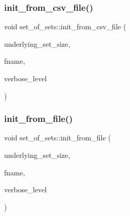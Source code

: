 \mbox{\label{classset__of__sets_ad8d229458a678f6e39a65c478d3d3bda}} 
\subsubsection{\texorpdfstring{init\+\_\+from\+\_\+csv\+\_\+file()}{init\_from\_csv\_file()}}
{\footnotesize\ttfamily void set\+\_\+of\+\_\+sets\+::init\+\_\+from\+\_\+csv\+\_\+file (\begin{DoxyParamCaption}\item[{\mbox{\hyperlink{galois_8h_a09fddde158a3a20bd2dcadb609de11dc}{I\+NT}}}]{underlying\+\_\+set\+\_\+size,  }\item[{const \mbox{\hyperlink{galois_8h_ab6cc7b4aeb6ea31aba2b3fbfc83ff5e6}{B\+Y\+TE}} $\ast$}]{fname,  }\item[{\mbox{\hyperlink{galois_8h_a09fddde158a3a20bd2dcadb609de11dc}{I\+NT}}}]{verbose\+\_\+level }\end{DoxyParamCaption})}

\mbox{\label{classset__of__sets_af1a1e4d1f577a86ff3a89b70d0f08f16}} 
\subsubsection{\texorpdfstring{init\+\_\+from\+\_\+file()}{init\_from\_file()}}
{\footnotesize\ttfamily void set\+\_\+of\+\_\+sets\+::init\+\_\+from\+\_\+file (\begin{DoxyParamCaption}\item[{\mbox{\hyperlink{galois_8h_a09fddde158a3a20bd2dcadb609de11dc}{I\+NT}}}]{underlying\+\_\+set\+\_\+size,  }\item[{const \mbox{\hyperlink{galois_8h_ab6cc7b4aeb6ea31aba2b3fbfc83ff5e6}{B\+Y\+TE}} $\ast$}]{fname,  }\item[{\mbox{\hyperlink{galois_8h_a09fddde158a3a20bd2dcadb609de11dc}{I\+NT}}}]{verbose\+\_\+level }\end{DoxyParamCaption})}

